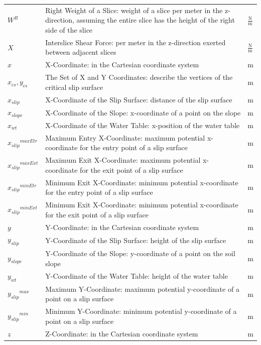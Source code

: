 \documentclass[12pt]{article}
\begin{document}
\begin{longtabu}{l X[l] l}
\\
${W^{R}}$ & Right Weight of a Slice: weight of a slice per meter in the z-direction, assuming the entire slice has the height of the right side of the slice & $\frac{\text{N}}{\text{m}}$
\\
$X$ & Interslice Shear Force: per meter in the z-direction exerted between adjacent slices & $\frac{\text{N}}{\text{m}}$
\\
$x$ & X-Coordinate: in the Cartesian coordinate system & m
\\
${x_{cs}},{y_{cs}}$ & The Set of X and Y Coordinates: describe the vertices of the critical slip surface & m
\\
${x_{slip}}$ & X-Coordinate of the Slip Surface: distance of the slip surface & m
\\
${x_{slope}}$ & X-Coordinate of the Slope: x-coordinate of a point on the slope & m
\\
${x_{wt}}$ & X-Coordinate of the Water Table: x-position of the water table & m
\\
${{x_{slip}}^{maxEtr}}$ & Maximum Entry X-Coordinate: maximum potential x-coordinate for the entry point of a slip surface & m
\\
${{x_{slip}}^{maxExt}}$ & Maximum Exit X-Coordinate: maximum potential x-coordinate for the exit point of a slip surface & m
\\
${{x_{slip}}^{minEtr}}$ & Minimum Exit X-Coordinate: minimum potential x-coordinate for the entry point of a slip surface & m
\\
${{x_{slip}}^{minExt}}$ & Minimum Exit X-Coordinate: minimum potential x-coordinate for the exit point of a slip surface & m
\\
$y$ & Y-Coordinate: in the Cartesian coordinate system & m
\\
${y_{slip}}$ & Y-Coordinate of the Slip Surface: height of the slip surface & m
\\
${y_{slope}}$ & Y-Coordinate of the Slope: y-coordinate of a point on the soil slope & m
\\
${y_{wt}}$ & Y-Coordinate of the Water Table: height of the water table & m
\\
${{y_{slip}}^{max}}$ & Maximum Y-Coordinate: maximum potential y-coordinate of a point on a slip surface & m
\\
${{y_{slip}}^{min}}$ & Minimum Y-Coordinate: minimum potential y-coordinate of a point on a slip surface & m
\\
$z$ & Z-Coordinate: in the Cartesian coordinate system & m
\\

\end{longtabu}
\end{document}
